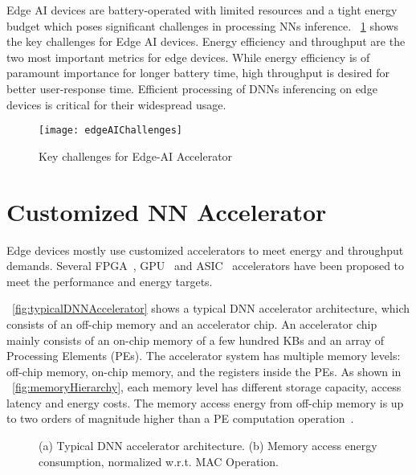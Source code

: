 Edge AI devices are battery-operated with limited resources and a tight energy budget which poses significant challenges in processing NNs inference. \figurename{~\ref{fig:edgeAIChallenges}} shows the key challenges for Edge AI devices. Energy efficiency and throughput are the two most important metrics for edge devices. While energy efficiency is of paramount importance for longer battery time, high throughput is desired for better user-response time. Efficient processing of DNNs inferencing on edge devices is critical for their widespread usage. 
\begin{figure}[!htb]
	\centering
	\captionsetup{font=sf}
	\texttt{[image: edgeAIChallenges]}
	\caption{Key challenges for Edge-AI Accelerator}
	\label{fig:edgeAIChallenges}
\end{figure}
\section{Customized NN Accelerator}
Edge devices mostly use customized accelerators to meet energy and throughput demands. Several FPGA~\cite{zhang2015optimizing,wei2019overcoming,gokhale2014240,8742284,gupta2015deep,alwani2016fused}, GPU~\cite{chetlur2014cudnn} and ASIC~\cite{Chen2016EyerissAS,chen2014diannao,chen2014dadiannao,du2015shidiannao} accelerators have been proposed to meet the performance and energy targets. 

\figurename{~\ref{fig:typicalDNNAccelerator}} shows a typical DNN accelerator architecture, which consists of an off-chip memory and an accelerator chip. An accelerator chip mainly consists of an on-chip memory of a few hundred KBs and an array of Processing Elements (PEs). The accelerator system has multiple memory levels: off-chip memory, on-chip memory, and the registers inside the PEs. As shown in \figurename{~\ref{fig:memoryHierarchy}}, each memory level has different storage capacity, access latency and energy costs. The memory access energy from off-chip memory is up to two orders of magnitude higher than a PE computation operation~\cite{Chen2016EyerissAS}. 
\begin{figure}[!htb]
	\centering
	\captionsetup{font=sf}
	\hfil
	\caption{(a) Typical DNN accelerator architecture. (b) Memory access energy consumption, normalized w.r.t. MAC Operation.}
	\label{fig:acceleratorAndRoofline}
\end{figure}


